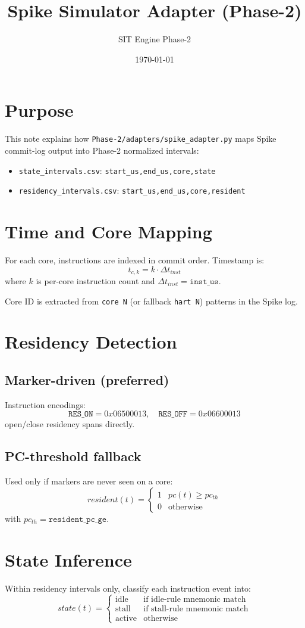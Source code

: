 \documentclass[11pt]{article}
\title{Spike Simulator Adapter (Phase-2)}
\author{SIT Engine Phase-2}
\date{\today}
\begin{document}
\maketitle

\section{Purpose}
This note explains how \texttt{Phase-2/adapters/spike\_adapter.py} maps Spike commit-log output into Phase-2 normalized intervals:
\begin{itemize}
  \item \texttt{state\_intervals.csv}: \texttt{start\_us,end\_us,core,state}
  \item \texttt{residency\_intervals.csv}: \texttt{start\_us,end\_us,core,resident}
\end{itemize}

\section{Time and Core Mapping}
For each core, instructions are indexed in commit order. Timestamp is:
\[
t_{c,k} = k \cdot \Delta t_{inst}
\]
where \(k\) is per-core instruction count and \(\Delta t_{inst}=\texttt{inst\_us}\).

Core ID is extracted from \texttt{core N} (or fallback \texttt{hart N}) patterns in the Spike log.

\section{Residency Detection}
\subsection*{Marker-driven (preferred)}
Instruction encodings:
\[
\texttt{RES\_ON} = 0x06500013,\quad \texttt{RES\_OFF} = 0x06600013
\]
open/close residency spans directly.

\subsection*{PC-threshold fallback}
Used only if markers are never seen on a core:
\[
resident(t)=
\begin{cases}
1 & pc(t)\ge pc_{th}\\
0 & \text{otherwise}
\end{cases}
\]
with \(pc_{th}=\texttt{resident\_pc\_ge}\).

\section{State Inference}
Within residency intervals only, classify each instruction event into:
\[
state(t)=
\begin{cases}
\text{idle} & \text{if idle-rule mnemonic match}\\
\text{stall} & \text{if stall-rule mnemonic match}\\
\text{active} & \text{otherwise}
\end{cases}
\]
\end{document}
